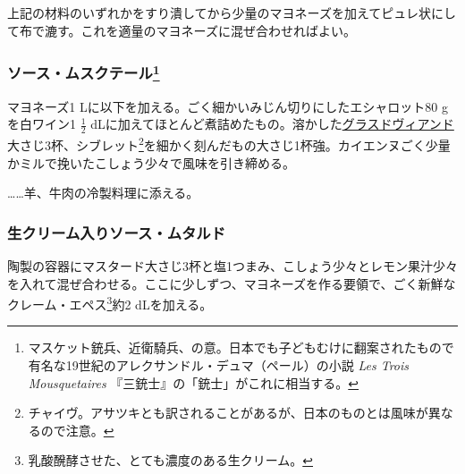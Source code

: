 \begin{recette}
上記の材料のいずれかをすり潰してから少量のマヨネーズを加えてピュレ状にして布で漉す。これを適量のマヨネーズに混ぜ合わせればよい。

\atoaki{}

\hypertarget{sauce-mousquetaire}{%
\subsubsection[ソース・ムスクテール]{\texorpdfstring{ソース・ムスクテール\footnote{マスケット銃兵、近衛騎兵、の意。日本でも子どもむけに翻案されたもので有名な19世紀のアレクサンドル・デュマ（ペール）の小説
  \emph{Les Trois Mousquetaires} 『三銃士』の「銃士」がこれに相当する。}}{ソース・ムスクテール}}\label{sauce-mousquetaire}}



マヨネーズ1 Lに以下を加える。ごく細かいみじん切りにしたエシャロット80 g
を白ワイン1 \(\frac{1}{2}\)
dLに加えてほとんど煮詰めたもの。溶かした\protect\hyperlink{glace-de-viande}{グラスドヴィアンド}大さじ3杯、シブレット\footnote{チャイヴ。アサツキとも訳されることがあるが、日本のものとは風味が異なるので注意。}を細かく刻んだもの大さじ1杯強。カイエンヌごく少量かミルで挽いたこしょう少々で風味を引き締める。

\ldots{}\ldots{}羊、牛肉の冷製料理に添える。

\atoaki{}

\hypertarget{sauce-moutarde-a-la-creme}{%
\subsubsection{生クリーム入りソース・ムタルド}\label{sauce-moutarde-a-la-creme}}



陶製の容器にマスタード大さじ3杯と塩1つまみ、こしょう少々とレモン果汁少々を入れて混ぜ合わせる。ここに少しずつ、マヨネーズを作る要領で、ごく新鮮なクレーム・エペス\footnote{乳酸醗酵させた、とても濃度のある生クリーム。}約2
dLを加える。


\end{recette}
